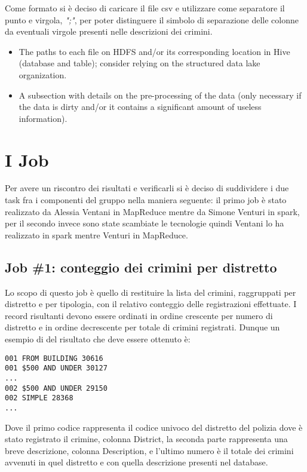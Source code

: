 \documentclass[10pt]{article}
\begin{document}
Come formato si è deciso di caricare il file csv e utilizzare come separatore il punto e virgola, \textit{";"}, per poter distinguere il simbolo di separazione delle colonne da eventuali virgole presenti nelle descrizioni dei crimini.

\begin{itemize}
\item The paths to each file on HDFS and/or its corresponding location in Hive (database and table); consider relying on the structured data lake organization.
\item A subsection with details on the pre-processing of the data (only necessary if the data is dirty and/or it contains a significant amount of useless information).
\end{itemize}


\section{I Job}

Per avere un riscontro dei risultati e verificarli si è deciso di suddividere i due task fra i componenti del gruppo nella maniera seguente: il primo job è stato realizzato da Alessia Ventani in MapReduce mentre da Simone Venturi in spark, per il secondo invece sono state scambiate le tecnologie quindi Ventani lo ha realizzato in spark mentre Venturi in MapReduce.


\subsection{Job \#1: conteggio dei crimini per distretto}
Lo scopo di questo job è quello di restituire la lista del crimini, raggruppati per distretto e per tipologia, con il relativo conteggio delle registrazioni effettuate. I record risultanti devono essere ordinati in ordine crescente per numero di distretto e in ordine decrescente per totale di crimini registrati. Dunque un esempio di del risultato che deve essere ottenuto è:
\begin{lstlisting}
001	FROM BUILDING 30616
001	$500 AND UNDER 30127
...
002	$500 AND UNDER 29150
002	SIMPLE 28368
...
\end{lstlisting}
Dove il primo codice rappresenta il codice univoco del distretto del polizia dove è stato registrato il crimine, colonna District, la seconda parte rappresenta una breve descrizione, colonna Description, e l'ultimo numero è il totale dei crimini avvenuti in quel distretto e con quella descrizione presenti nel database.
\end{document}

